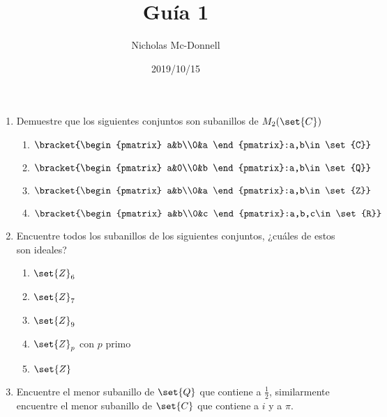 \documentclass{ayudantia}
\title{Guía 1}
\date{2019/10/15}
\author{Nicholas Mc-Donnell}
\begin{document}
\maketitle
\begin{enumerate}
    \item Demuestre que los siguientes conjuntos son subanillos de \(M_2(\set{C})\)
    \begin{multicols}{2}
        \begin{enumerate}[label=(\alph*)]
            \item \(\bracket{\begin{pmatrix}
                a&b\\0&a
            \end{pmatrix}:a,b\in\set{C}}\)
            \item \(\bracket{\begin{pmatrix}
                a&0\\0&b
            \end{pmatrix}:a,b\in\set{Q}}\)
            \item \(\bracket{\begin{pmatrix}
                a&b\\0&a
            \end{pmatrix}:a,b\in\set{Z}}\)
            \item \(\bracket{\begin{pmatrix}
                a&b\\0&c
            \end{pmatrix}:a,b,c\in\set{R}}\)
        \end{enumerate}
    \end{multicols}
    \item Encuentre todos los subanillos de los siguientes conjuntos, ¿cuáles de estos son ideales?
    \begin{multicols}{4}
        \begin{enumerate}[label=(\alph*)]
            \item \(\set{Z}_6\)
            \item \(\set{Z}_7\)
            \item \(\set{Z}_9\)
            \item \(\set{Z}_p\) con \(p\) primo
            \item \(\set{Z}\)
        \end{enumerate}
    \end{multicols}
    \item Encuentre el menor subanillo de \(\set{Q}\) que contiene a \(\frac12\), similarmente encuentre el menor subanillo de \(\set{C}\) que contiene a \(i\) y a \(\pi\).

\end{enumerate}
\end{document}
